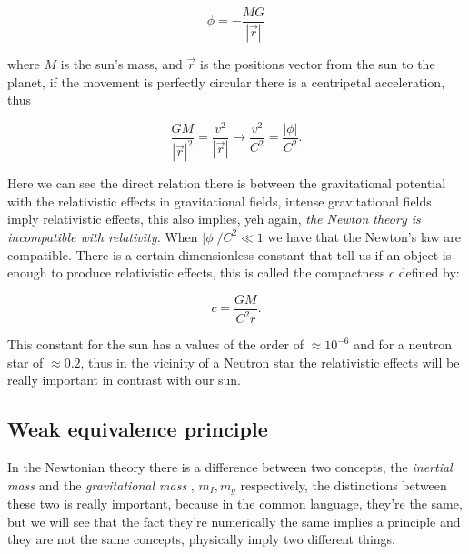         \begin{equation}
            \phi = - \frac{M G}{|\Vec{r}|}
        \end{equation}

        where $M$ is the sun's mass, and $\Vec{r}$ is the positions vector from the sun to the planet, if the movement is perfectly circular there is a centripetal acceleration, thus

        \begin{equation}
            \frac{GM}{|\Vec{r}|^2} = \frac{v^2}{|\Vec{r}|} \rightarrow \frac{v^2}{C^2} = \frac{|\phi|}{C^2}.
        \end{equation}

        Here we can see the direct relation there is between the gravitational potential with the relativistic effects in gravitational fields, intense gravitational fields imply relativistic effects, this also implies, yeh again, \textit{the Newton theory is incompatible with relativity.} When $|\phi| / C^2 \ll 1$ we have that the Newton's law are compatible. There is a certain dimensionless constant that tell us if an object is enough to produce relativistic effects, this is called the compactness $c$ defined by:

        \begin{equation}
            c = \frac{GM}{C^2r}.
        \end{equation}

        This constant for the sun has a values of the order of $\approx 10^{-6}$ and for a neutron star of $\approx 0.2$, thus in the vicinity of a Neutron star the relativistic effects will be really important in contrast with our sun.

    \subsection{Weak equivalence principle}

        In the Newtonian theory there is a difference between two concepts, the \textit{inertial mass} and the \textit{gravitational mass} , $m_I,m_g$ respectively, the distinctions between these two is really important, because in the common language, they're the same, but we will see that the fact they're numerically the same implies a principle and they are not the same concepts, physically imply two different things.

